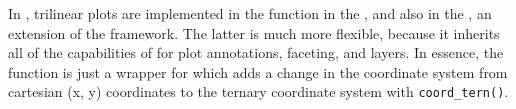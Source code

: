 \documentclass[10pt,krantz2]{krantz}\usepackage[]{graphicx}\usepackage[]{color}
\begin{document}
In \R, trilinear plots are implemented in the
 function in the ,
and also in the , an extension of
the  framework.  The latter is much more
flexible, because it inherits all of the capabilities
of  for plot annotations, faceting, and layers.
In essence,
the function  is just a wrapper for
 which adds a change in the coordinate
system from cartesian (x, y) coordinates to the
ternary coordinate system with \verb|coord_tern()|.
\end{document}
